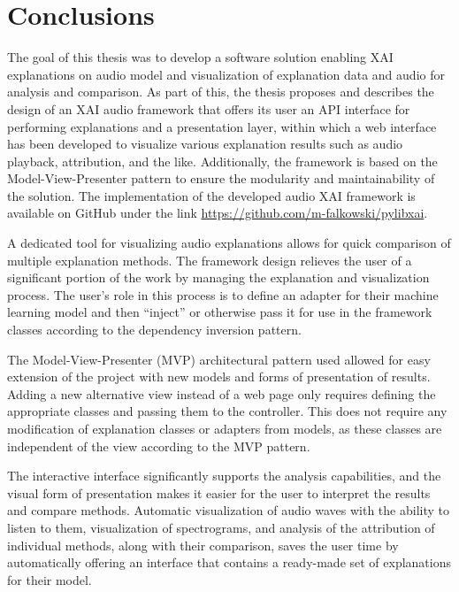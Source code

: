 \documentclass[
    bindingoffset=5mm,  %
    footnoteindent=3mm, %
    hyphenation=true    %
]{src/wut-thesis}
\begin{document}
%
%
\clearpage %
\section{Conclusions} \label{ch:summary}

The goal of this thesis was to develop a software solution enabling XAI explanations on audio model
and visualization of explanation data and audio for analysis and comparison. 
As part of this, the thesis proposes and describes the design of an XAI audio framework that offers its 
user an API interface for performing explanations and a presentation layer, within which a web interface
has been developed to visualize various explanation results such as audio playback, attribution, and the like.
Additionally, the framework is based on the Model-View-Presenter pattern to ensure
the modularity and maintainability of the solution. The implementation of the developed audio XAI framework is
available on GitHub under the link \href{https://github.com/m-falkowski/pylibxai}{https://github.com/m-falkowski/pylibxai}.

A dedicated tool for visualizing audio explanations allows for quick comparison of multiple explanation methods.
The framework design relieves the user of a significant portion of the work by managing the explanation and
visualization process. The user's role in this process is to define an adapter for their machine learning model
and then “inject” or otherwise pass it for use in the framework classes according to the dependency inversion
pattern.

The Model-View-Presenter (MVP) architectural pattern used allowed for easy extension of the project with new
models and forms of presentation of results. Adding a new alternative view instead of a web page only requires
defining the appropriate classes and passing them to the controller. This does not require any modification of
explanation classes or adapters from models, as these classes are independent of the view according to the MVP
pattern.

The interactive interface significantly supports the analysis capabilities, and the visual form of presentation
makes it easier for the user to interpret the results and compare methods. Automatic visualization of audio waves
with the ability to listen to them, visualization of spectrograms, and analysis of the attribution of individual
methods, along with their comparison, saves the user time by automatically offering an interface that contains a
ready-made set of explanations for their model.
\end{document}
